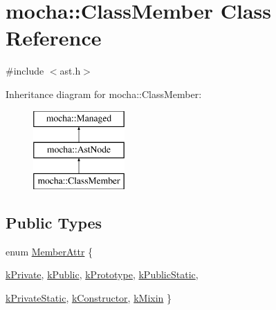 \hypertarget{classmocha_1_1_class_member}{
\section{mocha::ClassMember Class Reference}
\label{classmocha_1_1_class_member}
}


{\ttfamily \#include $<$ast.h$>$}

Inheritance diagram for mocha::ClassMember:\begin{figure}[H]
\begin{center}
\leavevmode
\includegraphics[height=3.000000cm]{classmocha_1_1_class_member}
\end{center}
\end{figure}
\subsection*{Public Types}
\begin{DoxyCompactItemize}
\item 
enum \hyperlink{classmocha_1_1_class_member_a3b8ac727565cfee0a488ff72a692315c}{MemberAttr} \{ \par
\hyperlink{classmocha_1_1_class_member_a3b8ac727565cfee0a488ff72a692315ca93091b1c2b66dc7b64f161785f7a989b}{kPrivate}, 
\hyperlink{classmocha_1_1_class_member_a3b8ac727565cfee0a488ff72a692315ca5e89cf7f3f42774c250c34b5b9470d84}{kPublic}, 
\hyperlink{classmocha_1_1_class_member_a3b8ac727565cfee0a488ff72a692315ca75c68efcb492562babd923ca06ad8d25}{kPrototype}, 
\hyperlink{classmocha_1_1_class_member_a3b8ac727565cfee0a488ff72a692315caf4065efc6f88f03fa9427dff213fd627}{kPublicStatic}, 
\par
\hyperlink{classmocha_1_1_class_member_a3b8ac727565cfee0a488ff72a692315ca504480033224ceb076d695a07ee64181}{kPrivateStatic}, 
\hyperlink{classmocha_1_1_class_member_a3b8ac727565cfee0a488ff72a692315ca4050c3c895caa0f8242b9eb7973a7c25}{kConstructor}, 
\hyperlink{classmocha_1_1_class_member_a3b8ac727565cfee0a488ff72a692315cad8b1e0ddba07d8d2b67a3a3fd60a332c}{kMixin}
 \}
\end{DoxyCompactItemize}
